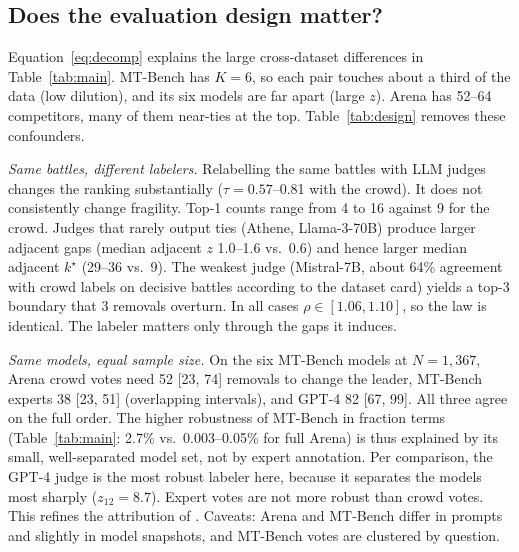 \documentclass{article}
\newcommand{\kstar}{k^\star}
\begin{document}
\subsection{Does the evaluation design matter?}\label{sec:design}

\begin{table}[t]
\caption{Controlled design comparisons (drop). \textbf{Top:} the same 49,938 Arena battles labelled by the crowd and by five LLM judges. $\tau$: Kendall correlation of BT scores with the crowd's; adjacent statistics over the top 10. \textbf{Bottom:} the same six models ranked by three labelers, compared at equal $N=1{,}367$ (100 random subsamples of the MT-Bench boards; bootstrap for the Arena board, which has $N=1{,}367$).}
\label{tab:design}
\centering\scriptsize\setlength{\tabcolsep}{3.5pt}


\vspace{4pt}

\end{table}

Equation~\ref{eq:decomp} explains the large cross-dataset differences in Table~\ref{tab:main}. MT-Bench has $K=6$, so each pair touches about a third of the data (low dilution), and its six models are far apart (large $z$). Arena has 52--64 competitors, many of them near-ties at the top. Table~\ref{tab:design} removes these confounders.

\emph{Same battles, different labelers.} Relabelling the same battles with LLM judges changes the ranking substantially ($\tau=0.57$--0.81 with the crowd). It does not consistently change fragility. Top-1 counts range from 4 to 16 against 9 for the crowd. Judges that rarely output ties (Athene, Llama-3-70B) produce larger adjacent gaps (median adjacent $z$ 1.0--1.6 vs.\ 0.6) and hence larger median adjacent $\kstar$ (29--36 vs.\ 9). The weakest judge (Mistral-7B, about 64\% agreement with crowd labels on decisive battles according to the dataset card) yields a top-3 boundary that 3 removals overturn. In all cases $\rho\in[1.06,1.10]$, so the law is identical. The labeler matters only through the gaps it induces.

\emph{Same models, equal sample size.} On the six MT-Bench models at $N=1{,}367$, Arena crowd votes need 52 [23, 74] removals to change the leader, MT-Bench experts 38 [23, 51] (overlapping intervals), and GPT-4 82 [67, 99]. All three agree on the full order. The higher robustness of MT-Bench in fraction terms (Table~\ref{tab:main}: 2.7\% vs.\ 0.003--0.05\% for full Arena) is thus explained by its small, well-separated model set, not by expert annotation. Per comparison, the GPT-4 judge is the most robust labeler here, because it separates the models most sharply ($z_{12}=8.7$). Expert votes are not more robust than crowd votes. This refines the attribution of \citet{huang2025dropping}. Caveats: Arena and MT-Bench differ in prompts and slightly in model snapshots, and MT-Bench votes are clustered by question.
\end{document}

